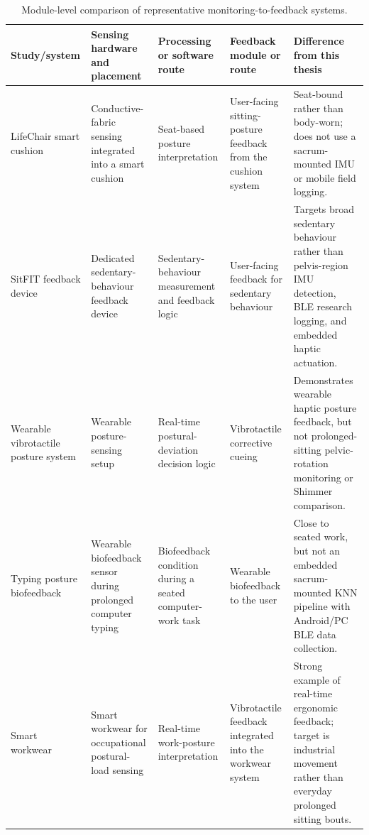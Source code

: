 \begin{table}[!tbp]
    \centering
    \scriptsize
    \caption{Module-level comparison of representative monitoring-to-feedback systems.}
    \label{tab:closed_loop_related_work}
    \begin{tabularx}{\textwidth}{p{}p{}p{}p{}X}
        \toprule
        Study/system & Sensing hardware and placement & Processing or software route & Feedback module or route & Difference from this thesis \\
        \midrule
        LifeChair smart cushion \cite{ishac2018lifechair}
            & Conductive-fabric sensing integrated into a smart cushion
            & Seat-based posture interpretation
            & User-facing sitting-posture feedback from the cushion system
            & Seat-bound rather than body-worn; does not use a sacrum-mounted IMU or mobile field logging. \\
        SitFIT feedback device \cite{gill2018sitfit_feedback_validation}
            & Dedicated sedentary-behaviour feedback device
            & Sedentary-behaviour measurement and feedback logic
            & User-facing feedback for sedentary behaviour
            & Targets broad sedentary behaviour rather than pelvis-region IMU detection, BLE research logging, and embedded haptic actuation. \\
        Wearable vibrotactile posture system \cite{gopalai2011vibrotactile_posture_system}
            & Wearable posture-sensing setup
            & Real-time postural-deviation decision logic
            & Vibrotactile corrective cueing
            & Demonstrates wearable haptic posture feedback, but not prolonged-sitting pelvic-rotation monitoring or Shimmer comparison. \\
        Typing posture biofeedback \cite{kuo2021_wearable_biofeedback_typing}
            & Wearable biofeedback sensor during prolonged computer typing
            & Biofeedback condition during a seated computer-work task
            & Wearable biofeedback to the user
            & Close to seated work, but not an embedded sacrum-mounted KNN pipeline with Android/PC BLE data collection. \\
        Smart workwear \cite{jin2020smart_workwear_feedback}
            & Smart workwear for occupational postural-load sensing
            & Real-time work-posture interpretation
            & Vibrotactile feedback integrated into the workwear system
            & Strong example of real-time ergonomic feedback; target is industrial movement rather than everyday prolonged sitting bouts. \\

\end{tabularx}
\end{table}
